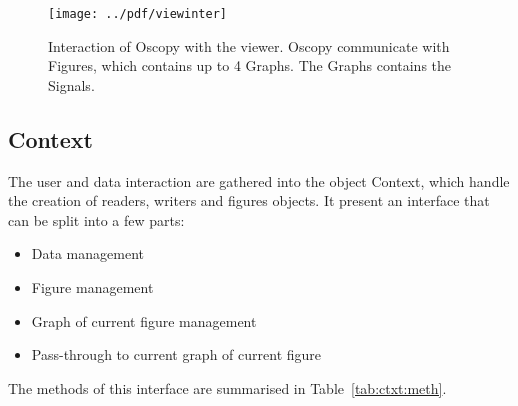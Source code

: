 \documentclass[a4paper,11pt]{article}
\newcommand{\cls}[1]{\textsf{#1}}
\newcommand{\ctx}{\cls{Context}}
\newcommand{\sig}{\cls{Signal}}
\begin{document}
\begin{figure}[htbp]
  \centering
  \texttt{[image: ../pdf/viewinter]}
  \caption{Interaction  of Oscopy with the viewer. Oscopy communicate with Figures, which contains up to 4 Graphs. The Graphs contains the \sig s.}
  \label{fig:viewinter}
\end{figure}

\subsection{Context}
The user and data interaction are gathered into the object \ctx, which handle the creation of readers, writers and figures objects.
It present an interface that can be split into a few parts:
\begin{itemize}
\item Data management
\item Figure management
\item Graph of current figure management
\item Pass-through to current graph of current figure
\end{itemize}
The methods of this interface are summarised in Table~\ref{tab:ctxt:meth}.
\end{document}
